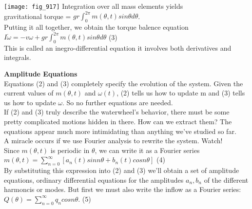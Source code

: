 \documentclass{article}
\newcommand\tab[1][1cm]{\hspace*{#1}}
\begin{document}
\texttt{[image: fig\_917]} 
Integration over all mass elements yields \\ \tab \tab
gravitational torque = $gr \int_{0}^{2\pi} m(\theta , t) sin \theta d \theta$. \\ \tab
Putting it all together, we obtain the torque balence equation \\ \tab \tab
$I\dot{\omega}=-v\omega + gr \int_{0}^{2\pi}m(\theta , t) sin \theta d \theta$ \tab (3)
\\
This is called an inegro-differential equation it involves both derivatives and integrals. 

\textbf {Amplitude Equations} \\ \tab
Equations (2) and (3) completely specify the evolution of the system. Given the current values of $m(\theta , t)$ and $\omega (t)$, (2) tells us how to update m and (3) tells us how to update $\omega$. So no further equations are needed. \\ \tab
If (2) and (3) truly describe the waterwheel's behavior, there must be some pretty complicated motions hidden in there. How can we extract them? The equations appear much more intimidating than anything we've studied so far. \\ \tab
A miracle occurs if we use Fourier analysis to rewrite the system. Watch! \\
Since $m(\theta , t)$ is periodic in $\theta$, we can write it as a Fourier series \\
$m(\theta , t)=\sum_{n=0}^{\infty}[a_{n}(t)sin n \theta + b_{n}(t)cos n \theta]$ \tab (4) \\
By substituting this expression into (2) and (3) we'll obtain a set of amplitude equations, ordinary differential equations for the amplitudes $a_{n}, b_{n}$ of the different harmoncis or modes. But first we must also write the inflow as a Fourier series: \\ \tab \tab
$Q(\theta)=\sum_{n=0}^{\infty}q_{n}cosn \theta$. \tab (5) \\
\end{document}
